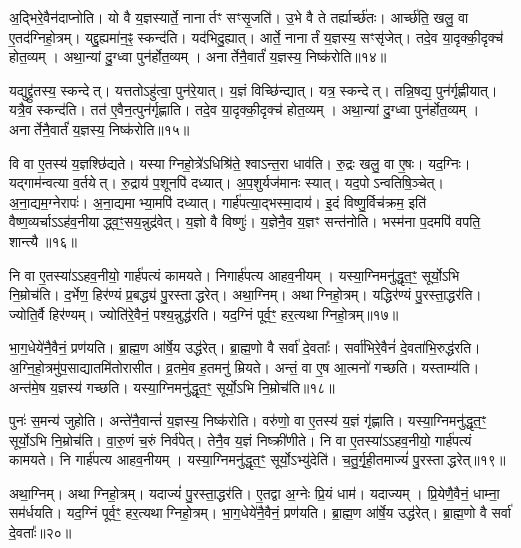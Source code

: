 अ॒द्भिरे॒वैन॑दाप्नोति।
यो वै य॒ज्ञस्यार्ते॒ नानार्तꣳ सꣳसृ॒जति॑।
उ॒भे वै ते तर्ह्यार्च्छ॑तः।
आर्च्छ॑ति॒ खलु॒ वा ए॒तद॑ग्निहो॒त्रम्।
यद्दु॒ह्यमा॑न॒ꣴ॒ स्कन्द॑ति।
यद॑भिदु॒ह्यात्।
आर्ते॒ नानार्तं य॒ज्ञस्य॒ सꣳसृ॑जेत्।
तदे॒व या॒दृक्की॒दृक्च॑ होत॒व्यम्।
अथा॒न्यां दु॒ग्ध्वा पुन॑र्\mbox{}होत॒व्यम्।
अनार्तेनै॒वार्तं॑ य॒ज्ञस्य॒ निष्क॑रोति॥१४॥

यद्युद्द्रु॑तस्य॒ स्कन्देत्।
यत्ततो\-ऽहु॑त्वा॒ पुन॑रे॒यात्।
य॒ज्ञं विच्छि॑न्द्यात्।
यत्र॒ स्कन्देत्।
तन्नि॒षद्य॒ पुन॑र्गृह्णीयात्।
यत्रै॒व स्कन्द॑ति।
तत॑ ए॒वैन॒त्पुन॑र्गृह्णाति।
तदे॒व या॒दृक्की॒दृक्च॑ होत॒व्यम्।
अथा॒न्यां दु॒ग्ध्वा पुन॑र्\mbox{}होत॒व्यम्।
अनार्तेनै॒वार्तं॑ य॒ज्ञस्य॒ निष्क॑रोति॥१५॥

वि वा ए॒तस्य॑ य॒ज्ञश्छि॑द्यते।
यस्याग्निहो॒त्रे॑\-ऽधिश्रि॑ते॒ श्वा\-ऽन्त॒रा धाव॑ति।
रु॒द्रः खलु॒ वा ए॒षः।
यद॒ग्निः।
यद्गाम॑न्वत्या व॒र्तयेत्।
रु॒द्राय॑ प॒शूनपि॑ दध्यात्।
अ॒प॒शुर्यज॑मानः स्यात्।
यद॒पो\-ऽन्वतिषि॒ञ्चेत्।
अ॒ना॒द्यम॒ग्नेरापः॑।
अ॒ना॒द्यमाभ्या॒मपि॑ दध्यात्।
गार्\mbox{}ह॑पत्या॒द्भस्मा॒दाय॑।
इ॒दं विष्णु॒र्विच॑क्रम॒ इति॑ वैष्ण॒व्यर्चा\-ऽऽह॑व॒नीयाद्ध्व॒ꣳ॒सय॒न्नुद्र॑वेत्।
य॒ज्ञो वै विष्णुः॑।
य॒ज्ञेनै॒व य॒ज्ञꣳ सन्त॑नोति।
भस्म॑ना प॒दमपि॑ वपति॒ शान्त्यै॥१६॥\anuvakamend[वै दे॒व्यदि॑तिर्मुञ्चति सृजति करोति करोत्याभ्या॒मपि॑ दध्या॒त् पञ्च॑ च]

नि वा ए॒तस्या॑\-ऽऽहव॒नीयो॒ गार्\mbox{}ह॑पत्यं कामयते।
निगार्\mbox{}ह॑पत्य आहव॒नीयम्।
यस्या॒ग्निमनु॑द्धृत॒ꣳ॒ सूर्यो॒ऽभि नि॒म्रोच॑ति।
द॒र्भेण॒ हिर॑ण्यं प्र॒बद्ध्य॑ पु॒रस्ताद्धरेत्।
अथा॒ग्निम्।
अथाग्निहो॒त्रम्।
यद्धिर॑ण्यं पु॒रस्ता॒द्धर॑ति।
ज्योति॒र्वै हिर॑ण्यम्।
ज्योति॑रे॒वैनं॒ पश्य॒न्नुद्ध॑रति।
यद॒ग्निं पूर्व॒ꣳ॒ हर॒त्यथाग्निहो॒त्रम्॥१७॥

भा॒ग॒धेये॑नै॒वैनं॒ प्रण॑यति।
ब्रा॒ह्म॒ण आ॑र्\mbox{}षे॒य उद्ध॑रेत्।
ब्रा॒ह्म॒णो वै सर्वा॑ दे॒वताः᳚।
सर्वा॑भिरे॒वैनं॑ दे॒वता॑भि॒रुद्ध॑रति।
अ॒ग्नि॒हो॒त्रमु॑प॒साद्यातमि॑तोरासीत।
व्र॒तमे॒व ह॒तमनु॑ म्रियते।
अन्तं॒ वा ए॒ष आ॒त्मनो॑ गच्छति।
यस्ताम्य॑ति।
अन्त॑मे॒ष य॒ज्ञस्य॑ गच्छति।
यस्या॒ग्निमनु॑द्धृत॒ꣳ॒ सूर्यो॒ऽभि नि॒म्रोच॑ति॥१८॥

पुनः॑ स॒मन्य॑ जुहोति।
अन्ते॑नै॒वान्तं॑ य॒ज्ञस्य॒ निष्क॑रोति।
वरु॑णो॒ वा ए॒तस्य॑ य॒ज्ञं गृ॑ह्णाति।
यस्या॒ग्निमनु॑द्धृत॒ꣳ॒ सूर्यो॒ऽभि नि॒म्रोच॑ति।
वा॒रु॒णं च॒रुं निर्व॑पेत्।
तेनै॒व य॒ज्ञं निष्क्री॑णीते।
नि वा ए॒तस्या॑\-ऽऽहव॒नीयो॒ गार्\mbox{}ह॑पत्यं कामयते।
नि गार्\mbox{}ह॑पत्य आहव॒नीयम्।
यस्या॒ग्निमनु॑द्धृत॒ꣳ॒ सूर्यो॒\-ऽभ्यु॑देति॑।
च॒तु॒र्गृ॒ही॒तमाज्यं॑ पु॒रस्ताद्धरेत्॥१९॥

अथा॒ग्निम्।
अथाग्निहो॒त्रम्।
यदाज्यं॑ पु॒रस्ता॒द्धर॑ति।
ए॒तद्वा अ॒ग्नेः प्रि॒यं धाम॑।
यदाज्यम्।
प्रि॒येणै॒वैनं॒ धाम्ना॒ सम॑र्धयति।
यद॒ग्निं पूर्व॒ꣳ॒ हर॒त्यथाग्निहो॒त्रम्।
भा॒ग॒धेये॑नै॒वैनं॒ प्रण॑यति।
ब्रा॒ह्म॒ण आ॑र्\mbox{}षे॒य उद्ध॑रेत्।
ब्रा॒ह्म॒णो वै सर्वा॑ दे॒वताः᳚॥२०॥

